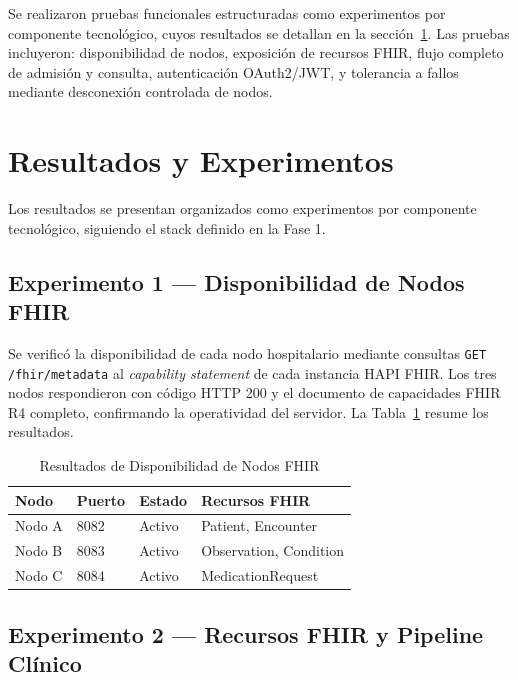 \documentclass[conference]{IEEEtran}
\begin{document}
Se realizaron pruebas funcionales estructuradas como experimentos
por componente tecnol\'ogico, cuyos resultados se detallan en la
secci\'on~\ref{sec:resultados}. Las pruebas incluyeron: disponibilidad
de nodos, exposici\'on de recursos FHIR, flujo completo de admisi\'on
y consulta, autenticaci\'on OAuth2/JWT, y tolerancia a fallos mediante
desconexi\'on controlada de nodos.

\section{Resultados y Experimentos}
\label{sec:resultados}

Los resultados se presentan organizados como experimentos por componente
tecnol\'ogico, siguiendo el stack definido en la Fase 1.

\subsection{Experimento 1 --- Disponibilidad de Nodos FHIR}

Se verific\'o la disponibilidad de cada nodo hospitalario mediante
consultas \texttt{GET /fhir/metadata} al \textit{capability statement}
de cada instancia HAPI FHIR. Los tres nodos respondieron con c\'odigo
HTTP 200 y el documento de capacidades FHIR R4 completo, confirmando
la operatividad del servidor. La Tabla~\ref{tab:disponibilidad} resume
los resultados.

\begin{table}[htbp]
\caption{Resultados de Disponibilidad de Nodos FHIR}
\label{tab:disponibilidad}
\begin{center}
\renewcommand{\arraystretch}{1.2}
\begin{tabular}{|p{1.6cm}|p{1.5cm}|p{1.2cm}|p{2.4cm}|}
\hline
\textbf{Nodo} & \textbf{Puerto} & \textbf{Estado} & \textbf{Recursos FHIR} \\
\hline
Nodo A & 8082 & Activo & Patient, Encounter \\
\hline
Nodo B & 8083 & Activo & Observation, Condition \\
\hline
Nodo C & 8084 & Activo & MedicationRequest \\
\hline
\end{tabular}
\end{center}
\end{table}

\subsection{Experimento 2 --- Recursos FHIR y Pipeline Cl\'inico}
\end{document}
